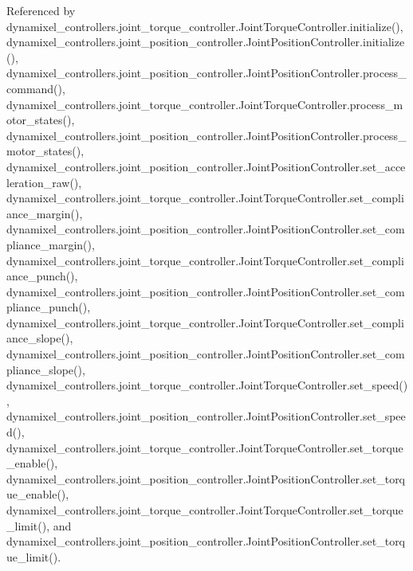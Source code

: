 Referenced by dynamixel\+\_\+controllers.\+joint\+\_\+torque\+\_\+controller.\+Joint\+Torque\+Controller.\+initialize(), dynamixel\+\_\+controllers.\+joint\+\_\+position\+\_\+controller.\+Joint\+Position\+Controller.\+initialize(), dynamixel\+\_\+controllers.\+joint\+\_\+position\+\_\+controller.\+Joint\+Position\+Controller.\+process\+\_\+command(), dynamixel\+\_\+controllers.\+joint\+\_\+torque\+\_\+controller.\+Joint\+Torque\+Controller.\+process\+\_\+motor\+\_\+states(), dynamixel\+\_\+controllers.\+joint\+\_\+position\+\_\+controller.\+Joint\+Position\+Controller.\+process\+\_\+motor\+\_\+states(), dynamixel\+\_\+controllers.\+joint\+\_\+position\+\_\+controller.\+Joint\+Position\+Controller.\+set\+\_\+acceleration\+\_\+raw(), dynamixel\+\_\+controllers.\+joint\+\_\+torque\+\_\+controller.\+Joint\+Torque\+Controller.\+set\+\_\+compliance\+\_\+margin(), dynamixel\+\_\+controllers.\+joint\+\_\+position\+\_\+controller.\+Joint\+Position\+Controller.\+set\+\_\+compliance\+\_\+margin(), dynamixel\+\_\+controllers.\+joint\+\_\+torque\+\_\+controller.\+Joint\+Torque\+Controller.\+set\+\_\+compliance\+\_\+punch(), dynamixel\+\_\+controllers.\+joint\+\_\+position\+\_\+controller.\+Joint\+Position\+Controller.\+set\+\_\+compliance\+\_\+punch(), dynamixel\+\_\+controllers.\+joint\+\_\+torque\+\_\+controller.\+Joint\+Torque\+Controller.\+set\+\_\+compliance\+\_\+slope(), dynamixel\+\_\+controllers.\+joint\+\_\+position\+\_\+controller.\+Joint\+Position\+Controller.\+set\+\_\+compliance\+\_\+slope(), dynamixel\+\_\+controllers.\+joint\+\_\+torque\+\_\+controller.\+Joint\+Torque\+Controller.\+set\+\_\+speed(), dynamixel\+\_\+controllers.\+joint\+\_\+position\+\_\+controller.\+Joint\+Position\+Controller.\+set\+\_\+speed(), dynamixel\+\_\+controllers.\+joint\+\_\+torque\+\_\+controller.\+Joint\+Torque\+Controller.\+set\+\_\+torque\+\_\+enable(), dynamixel\+\_\+controllers.\+joint\+\_\+position\+\_\+controller.\+Joint\+Position\+Controller.\+set\+\_\+torque\+\_\+enable(), dynamixel\+\_\+controllers.\+joint\+\_\+torque\+\_\+controller.\+Joint\+Torque\+Controller.\+set\+\_\+torque\+\_\+limit(), and dynamixel\+\_\+controllers.\+joint\+\_\+position\+\_\+controller.\+Joint\+Position\+Controller.\+set\+\_\+torque\+\_\+limit().

\mbox{\label{classdynamixel__controllers_1_1joint__controller_1_1_joint_controller_affc8be5e697a2ae71d284d8e0e59a4bd}} 
